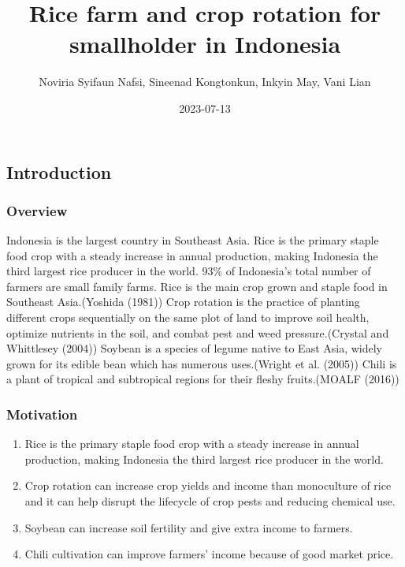 \documentclass[
]{article}
\title{Rice farm and crop rotation for smallholder in Indonesia}
\author{Noviria Syifaun Nafsi, Sineenad Kongtonkun, Inkyin May, Vani
Lian}
\date{2023-07-13}
\providecommand{\tightlist}{%
  \setlength{\itemsep}{0pt}\setlength{\parskip}{0pt}}
\begin{document}
\maketitle

\hypertarget{introduction}{%
\subsection{Introduction}\label{introduction}}

\hypertarget{overview}{%
\subsubsection{Overview}\label{overview}}

Indonesia is the largest country in Southeast Asia. Rice is the primary
staple food crop with a steady increase in annual production, making
Indonesia the third largest rice producer in the world. 93\% of
Indonesia's total number of farmers are small family farms. Rice is the
main crop grown and staple food in Southeast Asia.(Yoshida (1981)) Crop
rotation is the practice of planting different crops sequentially on the
same plot of land to improve soil health, optimize nutrients in the
soil, and combat pest and weed pressure.(Crystal and Whittlesey (2004))
Soybean is a species of legume native to East Asia, widely grown for its
edible bean which has numerous uses.(Wright et al. (2005)) Chili is a
plant of tropical and subtropical regions for their fleshy fruits.(MOALF
(2016))

\hypertarget{motivation}{%
\subsubsection{Motivation}\label{motivation}}

\begin{enumerate}
\def\labelenumi{\arabic{enumi}.}
\tightlist
\item
  Rice is the primary staple food crop with a steady increase in annual
  production, making Indonesia the third largest rice producer in the
  world.
\item
  Crop rotation can increase crop yields and income than monoculture of
  rice and it can help disrupt the lifecycle of crop pests and reducing
  chemical use.
\item
  Soybean can increase soil fertility and give extra income to farmers.
\item
  Chili cultivation can improve farmers' income because of good market
  price.
\end{enumerate}
\end{document}
